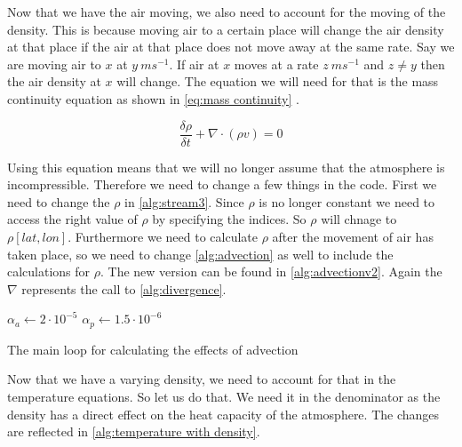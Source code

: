 Now that we have the air moving, we also need to account for the moving of the density. This is because moving air to a certain place will change the air density at that place if the air at that 
place does not move away at the same rate. Say we are moving air to $x$ at $y \ ms^{-1}$. If air at $x$ moves at a rate $z \ ms^{-1}$ and $z \neq y$ then the air density at $x$ will change.
The equation we will need for that is the mass continuity equation as shown in \autoref{eq:mass continuity} \cite{masscontinue}.

\begin{equation}
    \frac{\delta \rho}{\delta t} + \nabla \cdot (\rho v) = 0
    \label{eq:mass continuity}
\end{equation}

Using this equation means that we will no longer assume that the atmosphere is incompressible. Therefore we need to change a few things in the code. First we need to change the $\rho$ in 
\autoref{alg:stream3}. Since $\rho$ is no longer constant we need to access the right value of $\rho$ by specifying the indices. So $\rho$ will chnage to $\rho[lat, lon]$. Furthermore we need
to calculate $\rho$ after the movement of air has taken place, so we need to change \autoref{alg:advection} as well to include the calculations for $\rho$. The new version can be found in 
\autoref{alg:advectionv2}. Again the $\nabla$ represents the call to \autoref{alg:divergence}.


\begin{algorithm}
    $\alpha_a \leftarrow 2 \cdot 10^{-5}$ \;
    $\alpha_p \leftarrow 1.5 \cdot 10^{-6}$ \;
    \caption{The main loop for calculating the effects of advection}
    \label{alg:advectionv2}
\end{algorithm}

Now that we have a varying density, we need to account for that in the temperature equations. So let us do that. We need it in the denominator as the density has a direct effect on the 
heat capacity of the atmosphere. The changes are reflected in \autoref{alg:temperature with density}.

